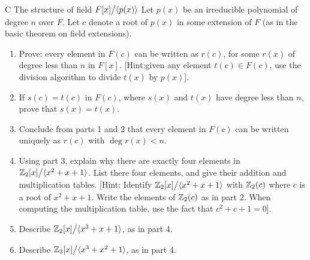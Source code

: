 \begin{exercise}{C The structure of field ${\textstyle F[x]}\big/{\textstyle \langle p(x)\rangle}$}
Let $p(x)$ be an irreducible polynomial of degree $n$ over $F$. Let $c$ denote a root of $p(x)$ in some extension of $F$ (as in the basic theorem on field extensions).
\begin{enumerate}
    \item Prove: every element in $F(c)$ can be written as $r(c)$, for some $r(x)$ of degree less than $n$ in $F[x]$. [Hint:given any element $t(c)\in F(c)$, use the division algorithm to divide $t(x)$ by $p(x)$].
    \item If $s(c)=t(c)$ in $F(c)$, where $s(x)$ and $t(x)$ have degree less than $n$, prove that $s(x)=t(x)$.
    \item Conclude from parts 1 and 2 that every element in $F(c)$ can be written uniquely as $r(c)$ with $\deg r(x)<n$.
    \item Using part 3, explain why there are exactly four elements in \\$
    {\textstyle \mathbb{Z}_2[x]}\big/{\textstyle \langle x^2+x+1\rangle}$. List there four elements, and give their addition and multiplication tables. [Hint: Identify ${\textstyle \mathbb{Z}_2[x]}\big/{\textstyle \langle x^2+x+1\rangle}$ with $\mathbb{Z}_2(c)$ where $c$ is a root of $x^2+x+1$. Write the elements of $\mathbb{Z}_2(c)$ as in part 2. When computing the multiplication table, use the fact that $c^2+c+1=0$].
    \item Describe ${\textstyle \mathbb{Z}_2[x]}\big/{\textstyle \langle x^3+x+1\rangle}$, as in part 4.
    \item Describe ${\textstyle \mathbb{Z}_3[x]}\big/{\textstyle \langle x^3+x^2+1\rangle}$, as in part 4.
\end{enumerate}
\end{exercise}
